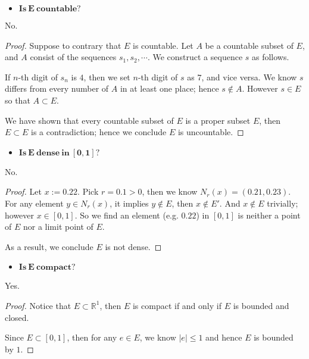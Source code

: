 \begin{Exercise}
	\begin{itemize}
		\item $\mathbf{Is\ E\ countable?}$
	\end{itemize}
	\begin{answer}
		No.
	\end{answer}
	\begin{proof}
		Suppose to contrary that $E$ is countable. Let $A$ be a countable subset of $E$, and $A$ consist of the sequences $s_1, s_2, \cdots$. We construct a sequence $s$ as follows.
		
		If $n$-th digit of $s_n$ is $4$, then we set $n$-th digit of $s$ as $7$, and vice versa. We know $s$ differs from every number of $A$ in at least one place; hence $s\notin A$. However $s\in E$ so that $A\subset E$.
		
		We have shown that every countable subset of $E$ is a proper subset $E$, then $E\subset E$ is a contradiction; hence we conclude $E$ is uncountable.
	\end{proof}
	
	\begin{itemize}
		\item $\mathbf{Is\ E\ dense\ in\ [0,1]?}$
	\end{itemize}
	\begin{answer}
		No.
	\end{answer}
	\begin{proof}
		Let $x := 0.22$. Pick $r = 0.1 > 0$, then we know $N_r(x) = (0.21, 0.23)$. For any element $y\in N_r(x)$, it implies $y\notin E$, then $x\notin E'$. And $x\notin E$ trivially; however $x\in [0,1]$. So we find an element (e.g. $0.22$) in $[0,1]$ is neither a point of $E$ nor a limit point of $E$.
		
		As a result, we conclude $E$ is not dense.
	\end{proof}
	
	\begin{itemize}
		\item $\mathbf{Is\ E\ compact?}$
	\end{itemize}
	\begin{answer}
		Yes.
	\end{answer}
	\begin{proof}
		Notice that $E\subset \mathbb{R}^1$, then $E$ is compact if and only if $E$ is bounded and closed.
		
		Since $E\subset[0,1]$, then for any $e\in E$, we know $|e| \leq 1$ and hence $E$ is bounded by $1$.
		

\end{proof}
\end{Exercise}
